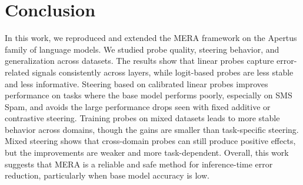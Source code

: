 \documentclass[sigconf]{acmart}
\begin{document}
\section{Conclusion}
In this work, we reproduced and extended the MERA framework on the Apertus family of language models. We studied probe quality, steering behavior, and generalization across datasets. The results show that linear probes capture error-related signals consistently across layers, while logit-based probes are less stable and less informative. Steering based on calibrated linear probes improves performance on tasks where the base model performs poorly, especially on SMS Spam, and avoids the large performance drops seen with fixed additive or contrastive steering. Training probes on mixed datasets leads to more stable behavior across domains, though the gains are smaller than task-specific steering. Mixed steering shows that cross-domain probes can still produce positive effects, but the improvements are weaker and more task-dependent. Overall, this work suggests that MERA is a reliable and safe method for inference-time error reduction, particularly when base model accuracy is low.



\clearpage





\end{document}

